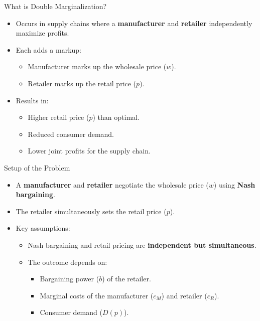 \documentclass[aspectratio=169]{beamer}  %
\begin{document}
\begin{frame}{What is Double Marginalization?}
    \begin{itemize}
        \item Occurs in supply chains where a \textbf{manufacturer} and \textbf{retailer} independently maximize profits.
        \item Each adds a markup:
        \begin{itemize}
            \item Manufacturer marks up the wholesale price (\(w\)).
            \item Retailer marks up the retail price (\(p\)).
        \end{itemize}
        \item Results in:
        \begin{itemize}
            \item Higher retail price (\(p\)) than optimal.
            \item Reduced consumer demand.
            \item Lower joint profits for the supply chain.
        \end{itemize}
    \end{itemize}
\end{frame}

\begin{frame}{Setup of the Problem}
    \begin{itemize}
        \item A \textbf{manufacturer} and \textbf{retailer} negotiate the wholesale price (\(w\)) using \textbf{Nash bargaining}.
        \item The retailer simultaneously sets the retail price (\(p\)).
        \item Key assumptions:
        \begin{itemize}
            \item Nash bargaining and retail pricing are \textbf{independent but simultaneous}.
            \item The outcome depends on:
            \begin{itemize}
                \item Bargaining power (\(b\)) of the retailer.
                \item Marginal costs of the manufacturer (\(c_M\)) and retailer (\(c_R\)).
                \item Consumer demand (\(D(p)\)).
            \end{itemize}
        \end{itemize}
    \end{itemize}
\end{frame}
\end{document}
